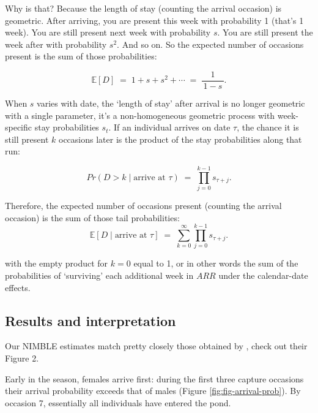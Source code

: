 \documentclass[
  12pt,
]{krantz}
\begin{document}
Why is that? Because the length of stay (counting the arrival occasion) is geometric. After arriving, you are present this week with probability 1 (that's 1 week). You are still present next week with probability \(s\). You are still present the week after with probability \(s^2\). And so on. So the expected number of occasions present is the sum of those probabilities:

\[
\mathbb{E}[D] \;=\; 1+s+s^2+\cdots \;=\; \frac{1}{\,1 - s\,}.
\]

When \(s\) varies with date, the `length of stay' after arrival is no longer geometric with a single parameter, it's a non-homogeneous geometric process with week-specific stay probabilities \(s_t\). If an individual arrives on date \(\tau\), the chance it is still present \(k\) occasions later is the product of the stay probabilities along that run:

\[
Pr(D > k \mid \text{arrive at } \tau) \;=\; \prod_{j=0}^{k-1} s_{\tau + j}.
\]

Therefore, the expected number of occasions present (counting the arrival occasion) is the sum of those tail probabilities:
\[
\mathbb{E}[D \mid \text{arrive at } \tau]
\;=\;
\sum_{k=0}^{\infty} \prod_{j=0}^{k-1} s_{\tau + j}.
\]

with the empty product for \(k=0\) equal to 1, or in other words the sum of the probabilities of `surviving' each additional week in \(ARR\) under the calendar-date effects.

\subsection{Results and interpretation}\label{results-and-interpretation-8}

Our NIMBLE estimates match pretty closely those obtained by \citet{guerin_advances_2017}, check out their Figure 2.

Early in the season, females arrive first: during the first three capture occasions their arrival probability exceeds that of males (Figure \ref{fig:fig-arrival-prob}). By occasion 7, essentially all individuals have entered the pond.
\end{document}
